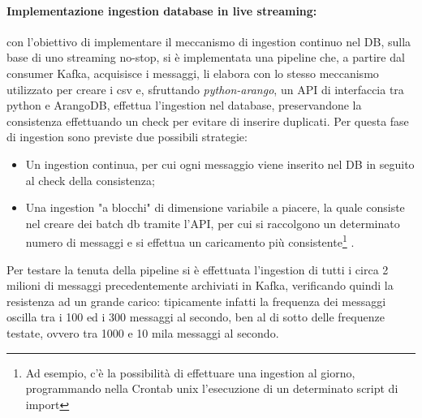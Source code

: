 \documentclass[fleqn,10pt]{SelfArx} %
\begin{document}
{{\paragraph{Implementazione ingestion database in live streaming:}
con l'obiettivo di implementare il meccanismo di ingestion continuo nel DB, sulla base di uno streaming no-stop, si è implementata una pipeline che, a partire dal consumer Kafka, acquisisce i messaggi, li elabora con lo stesso meccanismo utilizzato per creare i csv e, sfruttando \textit{python-arango}, un API di interfaccia tra python e ArangoDB, effettua l'ingestion nel database, preservandone la consistenza effettuando un check per evitare di inserire duplicati. 
Per questa fase di ingestion sono previste due possibili strategie:
\begin{itemize}[noitemsep]
\item Un ingestion continua, per cui ogni messaggio viene inserito nel DB in seguito al check della consistenza;
\item Una ingestion "a blocchi" di dimensione variabile a piacere, la quale consiste nel creare dei batch db tramite l’API, per cui si raccolgono un determinato
numero di messaggi e si effettua un caricamento più consistente\footnote{Ad esempio, c’è la possibilità di effettuare una ingestion al giorno, programmando nella Crontab unix l’esecuzione di un determinato script di import} .
\end{itemize}
Per testare la tenuta della pipeline si è effettuata l'ingestion di tutti i circa 2 milioni di messaggi precedentemente archiviati in Kafka, verificando quindi la resistenza ad un grande carico: tipicamente infatti la frequenza dei messaggi oscilla tra i 100 ed i 300 messaggi al secondo, ben al di sotto delle frequenze testate, ovvero tra 1000 e 10 mila messaggi al secondo.
}
}
\end{document}
